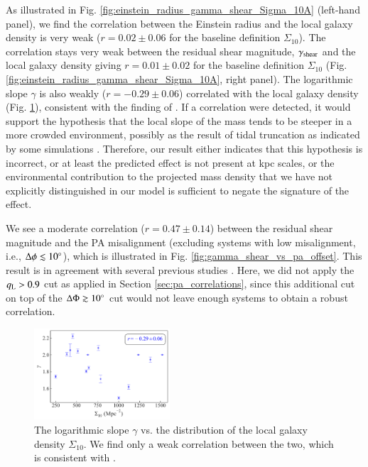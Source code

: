 \documentclass{aa}
\newcommand{\newedit}[1]{{#1}} %
\begin{document}
\newedit{As illustrated in Fig. \ref{fig:einstein_radius_gamma_shear_Sigma_10A} (left-hand panel), we find the correlation between the Einstein radius and the local galaxy density is very weak ($r= 0.02 \pm 0.06$ for the baseline definition $\Sigma_{10}$). The correlation stays very weak between the residual shear magnitude, $\gamma_{\rm shear}$ and the local galaxy density giving $r= 0.01 \pm 0.02$ for the baseline definition $\Sigma_{10}$ (Fig. \ref{fig:einstein_radius_gamma_shear_Sigma_10A}, right panel). The logarithmic slope $\gamma$ is also weakly ($r= -0.29 \pm 0.06$) correlated with the local galaxy density (Fig. \ref{fig:gamma_Sigma_10A}), consistent with the finding of \citet{Treu09}.} \newedit{If a correlation were detected, it would support the hypothesis that the local slope of the mass tends to be steeper in a more crowded environment, possibly as the result of tidal truncation as indicated by some simulations \citep[e.g.,][]{Dobke07}. Therefore, our result either indicates that this hypothesis is incorrect, or at least the predicted effect is not present at kpc scales, or the environmental contribution to the projected mass density that we have not explicitly distinguished in our model is sufficient to negate the signature of the effect.}


\newedit{We see a moderate correlation ($r= 0.47 \pm 0.14$) between the residual shear magnitude and the PA misalignment (excluding systems with low misalignment, i.e., $\Delta \phi \lesssim 10 ^\circ $), which is illustrated in Fig. \ref{fig:gamma_shear_vs_pa_offset}. 
This result is in agreement with several previous studies \citep[e.g.,][]{Gavazzi12, Bruderer16, Shajib19}}. Here, we did not apply the $q_{\rm L} > 0.9$ cut as applied in Section \ref{sec:pa_correlations}, since this additional cut on top of the  $\Delta\Phi \gtrsim 10^\circ$ cut would not leave enough systems to obtain a robust correlation.


\begin{figure}[h]
  \centering
  \includegraphics[width=0.45\textwidth]{figures/gamma_vs_Sigma_10A.pdf}
  \caption{\newedit{ The logarithmic slope $\gamma$ vs. the distribution of the local galaxy density $\Sigma_{10}$. We find only a weak correlation between the two, which is consistent with \citet{Treu09}.}}
  \label{fig:gamma_Sigma_10A}
\end{figure}
\end{document}
